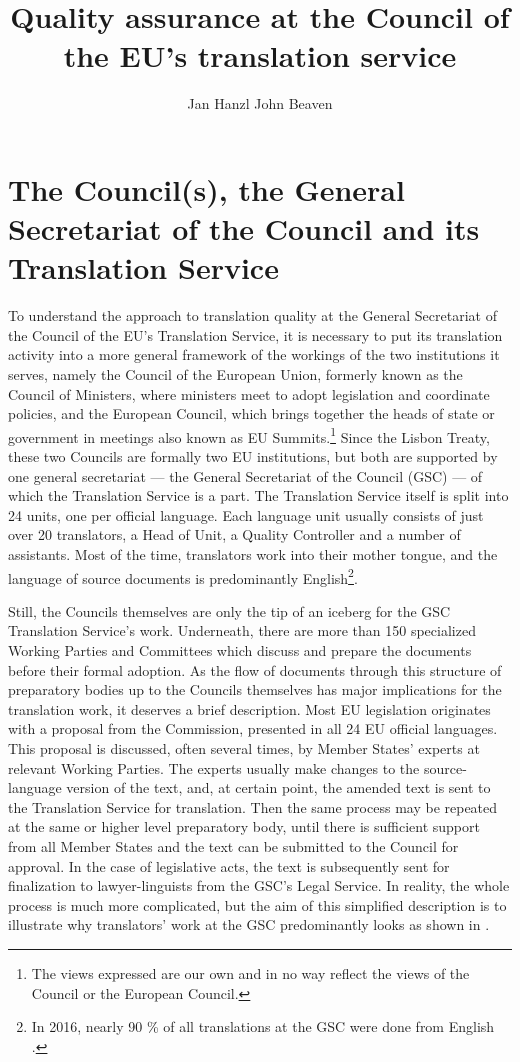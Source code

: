 \documentclass[output=paper]{langsci/langscibook}
\author{Jan Hanzl\lastand
John Beaven\affiliation{Council of the European Union}}
\title{Quality assurance at the Council of the EU’s translation service}
\begin{document}
\section{The Council(s), the General Secretariat of the Council and its Translation Service}\label{sec:hanzl:hanzl:1}

To understand the approach to translation quality at the General Secretariat of the Council of the EU's Translation Service, it is necessary to put its translation activity into a more general framework of the workings of the two institutions it serves, namely the Council of the European Union, formerly known as the Council of Ministers, where ministers meet to adopt legislation and coordinate policies, and the European Council, which brings together the heads of state or government in meetings also known as EU Summits.\footnote{The views expressed are our own and in no way reflect the views of the Council or the European Council.} Since the Lisbon Treaty, these two Councils are formally two EU institutions, but both are supported by one general secretariat — the General Secretariat of the Council (GSC) — of which the Translation Service is a part. The Translation Service itself is split into 24 units, one per official language. Each language unit usually consists of just over 20 translators, a Head of Unit, a Quality Controller and a number of assistants. Most of the time, translators work into their mother tongue, and the language of source documents is predominantly English\footnote{In 2016, nearly 90 \% of all translations at the GSC were done from English \citep{Council2017}.}.

Still, the Councils themselves are only the tip of an iceberg for the GSC Translation Service's work. Underneath, there are more than 150 specialized Working Parties and Committees which discuss and prepare the documents before their formal adoption. As the flow of documents through this structure of preparatory bodies up to the Councils themselves has major implications for the translation work, it deserves a brief description. Most EU legislation originates with a proposal from the Commission, presented in all 24 EU official languages. This proposal is discussed, often several times, by Member States' experts at relevant Working Parties. The experts usually make changes to the source-language version of the text, and, at certain point, the amended text is sent to the Translation Service for translation. Then the same process may be repeated at the same or higher level preparatory body, until there is sufficient support from all Member States and the text can be submitted to the Council for approval. In the case of legislative acts, the text is subsequently sent for finalization to lawyer-linguists from the GSC's Legal Service. In reality, the whole process is much more complicated, but the aim of this simplified description is to illustrate why translators' work at the GSC predominantly looks as shown in .
\end{document}
